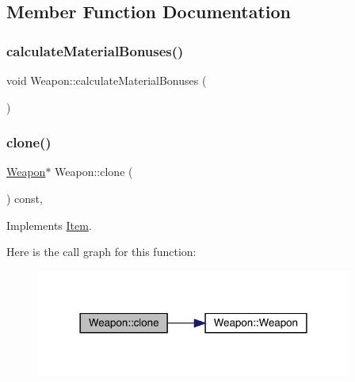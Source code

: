 \subsection{Member Function Documentation}
\mbox{\label{class_weapon_ad7be6ba61b660d807b5b56c289defbde}} 
\subsubsection{\texorpdfstring{calculate\+Material\+Bonuses()}{calculateMaterialBonuses()}}
{\footnotesize\ttfamily void Weapon\+::calculate\+Material\+Bonuses (\begin{DoxyParamCaption}{ }\end{DoxyParamCaption})}

\mbox{\label{class_weapon_a4a914fa26d1d67a5d890252950f6b9be}} 
\subsubsection{\texorpdfstring{clone()}{clone()}}
{\footnotesize\ttfamily \mbox{\hyperlink{class_weapon}{Weapon}}$\ast$ Weapon\+::clone (\begin{DoxyParamCaption}{ }\end{DoxyParamCaption}) const\hspace{0.3cm}{\ttfamily [inline]}, {\ttfamily [virtual]}}



Implements \mbox{\hyperlink{class_item_a6d963581e2caad2e08979683a827f39f}{Item}}.

Here is the call graph for this function\+:
\nopagebreak
\begin{figure}[H]
\begin{center}
\leavevmode
\includegraphics[width=294pt]{db/de5/class_weapon_a4a914fa26d1d67a5d890252950f6b9be_cgraph}
\end{center}
\end{figure}
\mbox{\label{class_weapon_a0755dc1352391eb484644ab4e4cf144d}} 
